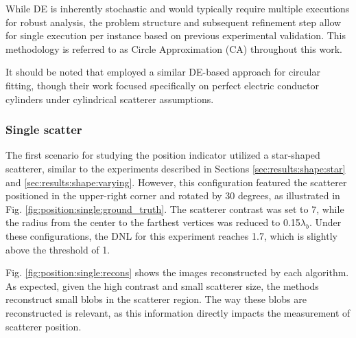 \documentclass{IEEEtran}
\begin{document}
            While DE is inherently stochastic and would typically require multiple executions for robust analysis, the problem structure and subsequent refinement step allow for single execution per instance based on previous experimental validation. This methodology is referred to as Circle Approximation (CA) throughout this work.

            It should be noted that \cite{michalski2000electromagnetic} employed a similar DE-based approach for circular fitting, though their work focused specifically on perfect electric conductor cylinders under cylindrical scatterer assumptions.

			\subsubsection{Single scatter}\label{sec:results:position:single}

                The first scenario for studying the position indicator utilized a star-shaped scatterer, similar to the experiments described in Sections \ref{sec:results:shape:star} and \ref{sec:results:shape:varying}. However, this configuration featured the scatterer positioned in the upper-right corner and rotated by 30 degrees, as illustrated in Fig. \ref{fig:position:single:ground_truth}. The scatterer contrast was set to 7, while the radius from the center to the farthest vertices was reduced to 0.15$\lambda_b$. Under these configurations, the DNL for this experiment reaches 1.7, which is slightly above the threshold of 1.


                Fig. \ref{fig:position:single:recons} shows the images reconstructed by each algorithm. As expected, given the high contrast and small scatterer size, the methods reconstruct small blobs in the scatterer region. The way these blobs are reconstructed is relevant, as this information directly impacts the measurement of scatterer position. 
\end{document}
